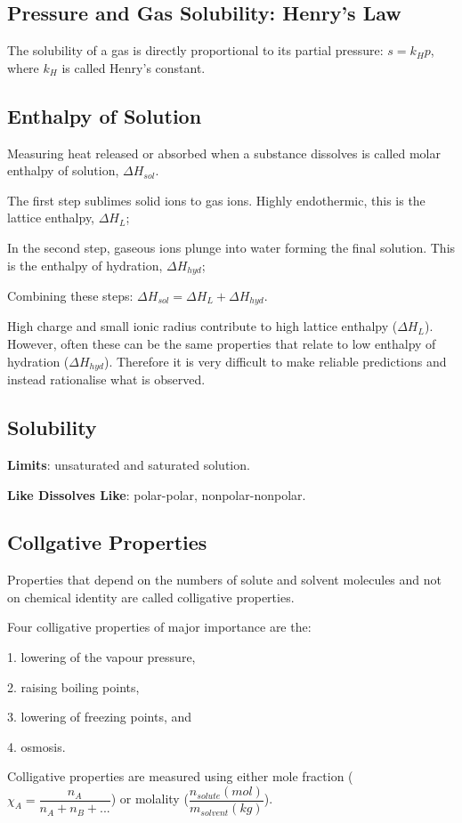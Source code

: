 \documentclass[a4paper,12pt]{article}
\begin{document}
\subsection{Pressure and Gas Solubility: Henry's Law}
The solubility of a gas is directly proportional to its partial pressure: $s = k_{H}p$, where $k_{H}$ is called Henry's constant.
\subsection{Enthalpy of Solution}
Measuring heat released or absorbed when a substance dissolves is called molar enthalpy of solution, $\Delta H_{sol}$.\par
The first step sublimes solid ions to gas ions. Highly endothermic, this is the lattice enthalpy, $\Delta H_{L}$;\par
In the second step, gaseous ions plunge into water forming the final solution. This is the enthalpy of hydration, $\Delta H_{hyd}$;\par
Combining these steps: $\Delta H_{sol}=\Delta H_{L}+\Delta H_{hyd}$.\par
High charge and small ionic radius contribute to high lattice enthalpy ($\Delta H_{L}$). However, often these can be the same properties that relate to low enthalpy of hydration ($\Delta H_{hyd}$). Therefore it is very difficult to make reliable predictions and instead rationalise what is observed.
\subsection{Solubility}
\textbf{Limits}: unsaturated and saturated solution.\par
\textbf{Like Dissolves Like}: polar-polar, nonpolar-nonpolar.
\subsection{Collgative Properties}
Properties that depend on the numbers of solute and solvent molecules and not on chemical identity are called colligative properties.\par
Four colligative properties of major importance are the:\par
1. lowering of the vapour pressure,\par
2. raising boiling points,\par
3. lowering of freezing points, and\par
4. osmosis.\par
Colligative properties are measured using either mole fraction ($\chi_{A}=\dfrac{n_{A}}{n_{A}+n_{B}+...}$) or molality ($\dfrac{n_{solute}(mol)}{m_{solvent}(kg)}$).
\end{document}
